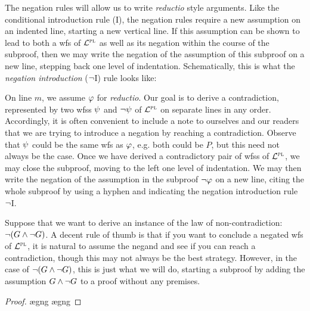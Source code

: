 The negation rules will allow us to write \textit{reductio} style arguments.
Like the conditional introduction rule (\eif I), the negation rules require a new assumption on an indented line, starting a new vertical line.
If this assumption can be shown to lead to both a wfs of $\mathcal{L}^{\textsc{pl}}$ as well as its negation within the course of the subproof, then we may write the negation of the assumption of this subproof on a new line, stepping back one level of indentation.
Schematically, this is what the \textit{negation introduction} ($\neg$I) rule looks like:



On line $m$, we assume $\varphi$ for \emph{reductio}.
Our goal is to derive a contradiction, represented by two wfss $\psi$ and $\neg\psi$ of $\mathcal{L}^{\textsc{pl}}$ on separate lines in any order.
Accordingly, it is often convenient to include a note to ourselves and our readers that we are trying to introduce a negation by reaching a contradiction.
Observe that $\psi$ could be the same wfs as $\varphi$, e.g. both could be $P$, but this need not always be the case. 
Once we have derived a contradictory pair of wfss of $\mathcal{L}^{\textsc{pl}}$, we may close the subproof, moving to the left one level of indentation.
We may then write the negation of the assumption in the subproof $\neg\varphi$ on a new line, citing the whole subproof by using a hyphen and indicating the negation introduction rule $\neg$I.

Suppose that we want to derive an instance of the law of non-contradiction: $\neg(G \wedge \neg G)$.
A decent rule of thumb is that if you want to conclude a negated wfs of $\mathcal{L}^{\textsc{pl}}$, it is natural to assume the negand and see if you can reach a contradiction, though this may not always be the best strategy.
However, in the case of $\neg (G \wedge \neg G)$, this is just what we will do, starting a subproof by adding the assumption $G\wedge \neg G$ to a proof without any premises.

\begin{proof}
	\open 
		\ae{gng}
		\ae{gng}
	\close
\end{proof}

